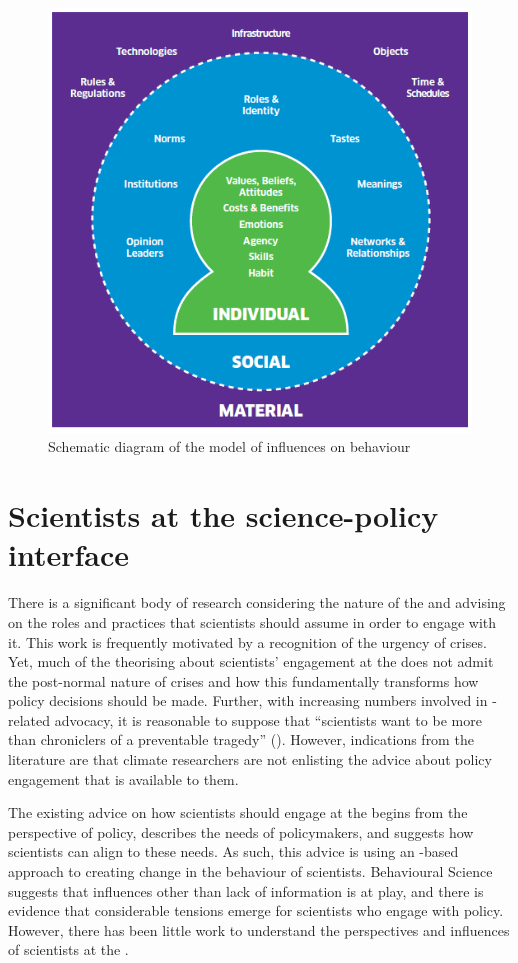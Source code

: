 \begin{figure}
    \centering
    \includegraphics[width=0.5\linewidth]{figures/ism.png}
    \caption{Schematic diagram of the \ISM{} model of influences on behaviour}
    \label{fig:ism}
\end{figure}

\section{Scientists at the science-policy interface}\label{sec:litjust}

There is a significant body of research considering the nature of the \SPI{} and advising on the roles and practices that scientists should assume in order to engage with it. This work is frequently motivated by a recognition of the urgency of \CAN{} crises. Yet, much of the theorising about scientists' engagement at the \SPI{} does not admit the post-normal nature of \CAN{} crises and how this fundamentally transforms how policy decisions should be made. Further, with increasing numbers involved in \CAN-related advocacy, it is reasonable to suppose that ``scientists want to be more than chroniclers of a preventable tragedy'' (\cite{WyattGT2024}). However, indications from the literature are that climate researchers are not enlisting the advice about policy engagement that is available to them.

The existing advice on how scientists should engage at the \SPI{} begins from the perspective of policy, describes the needs of policymakers, and suggests how scientists can align to these needs. As such, this advice is using an \IDM-based approach to creating change in the behaviour of scientists. Behavioural Science suggests that influences other than lack of information is at play, and there is evidence that considerable tensions emerge for scientists who engage with policy. However, there has been little work to understand the perspectives and influences of scientists at the \SPI. 
